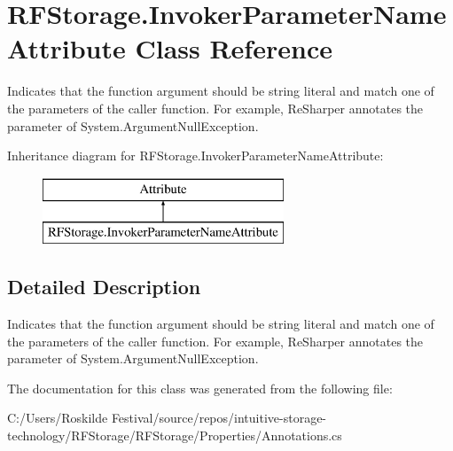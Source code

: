 \hypertarget{class_r_f_storage_1_1_invoker_parameter_name_attribute}{}\section{R\+F\+Storage.\+Invoker\+Parameter\+Name\+Attribute Class Reference}
\label{class_r_f_storage_1_1_invoker_parameter_name_attribute}


Indicates that the function argument should be string literal and match one of the parameters of the caller function. For example, Re\+Sharper annotates the parameter of System.\+Argument\+Null\+Exception.  


Inheritance diagram for R\+F\+Storage.\+Invoker\+Parameter\+Name\+Attribute\+:\begin{figure}[H]
\begin{center}
\leavevmode
\includegraphics[height=2.000000cm]{class_r_f_storage_1_1_invoker_parameter_name_attribute}
\end{center}
\end{figure}


\subsection{Detailed Description}
Indicates that the function argument should be string literal and match one of the parameters of the caller function. For example, Re\+Sharper annotates the parameter of System.\+Argument\+Null\+Exception. 


\begin{DoxyCode}{0}
\DoxyCodeLine{\}}
\end{DoxyCode}


The documentation for this class was generated from the following file\+:\begin{DoxyCompactItemize}
\item 
C\+:/\+Users/\+Roskilde Festival/source/repos/intuitive-\/storage-\/technology/\+R\+F\+Storage/\+R\+F\+Storage/\+Properties/Annotations.\+cs\end{DoxyCompactItemize}
